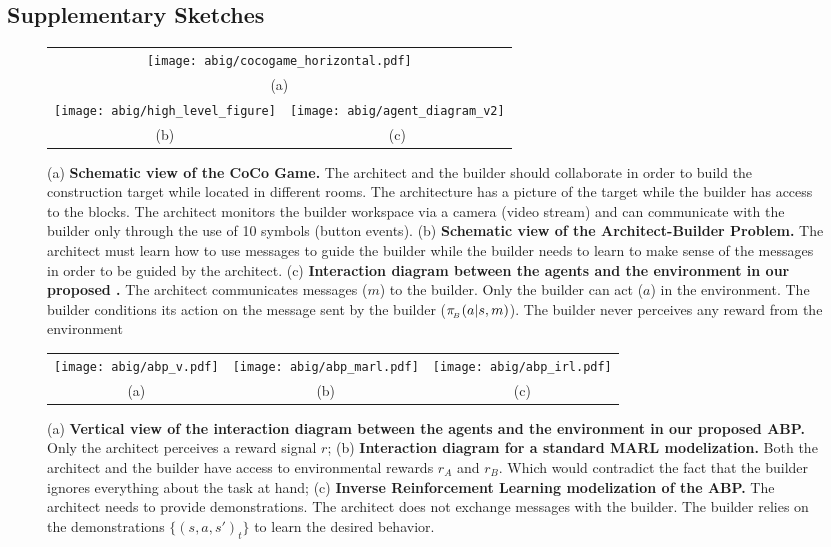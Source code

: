 \subsection{Supplementary Sketches}
\label{ap:sec_sketch}
\begin{figure}[h!]
    \centering
    \begin{tabular}{cc}
    \multicolumn{2}{c}{\texttt{[image: abig/cocogame\_horizontal.pdf]}}\\
    \multicolumn{2}{c}{\small (a)}\\
 \texttt{[image: abig/high\_level\_figure]}    &  \texttt{[image: abig/agent\_diagram\_v2]} \\
    \small (b) & \small(c)
    \end{tabular}
    \caption{\small (a) \textbf{Schematic view of the CoCo Game.} The architect and the builder should collaborate in order to build the construction target while located in different rooms. The architecture has a picture of the target while the builder has access to the blocks. The architect monitors the builder workspace via a camera (video stream) and can communicate with the builder only through the use of 10 symbols (button events). (b) \textbf{Schematic view of the Architect-Builder Problem. } The architect must learn how to use messages to guide the builder while the builder needs to learn to make sense of the messages in order to be guided by the architect. (c) \textbf{Interaction diagram between the agents and the environment in our proposed \abp.} The architect communicates messages ($m$) to the builder.  Only the builder can act ($a$) in the environment. The builder conditions its action on the message sent by the builder ($\pi_{\!_B}(a|s,m)$). The builder never perceives any reward from the environment}
    \label{fig:sup_diagram}
\end{figure}

\begin{figure}[h!]
    \centering
    \begin{tabular}{cccc}
    \texttt{[image: abig/abp\_v.pdf]} & \texttt{[image: abig/abp\_marl.pdf]} &  \multicolumn{2}{c}{\texttt{[image: abig/abp\_irl.pdf]}}\\
    \small (a) & \small(b) & \multicolumn{2}{c}{\small(c)}
    \end{tabular}
    \caption{\small (a) \textbf{Vertical view of the interaction diagram between the agents and the environment in our proposed ABP. } Only the architect perceives a reward signal $r$; (b) \textbf{Interaction diagram for a standard MARL modelization. } Both the architect and the builder have access to environmental rewards $r_A$ and $r_B$. Which would contradict the fact that the builder ignores everything about the task at hand; (c) \textbf{Inverse Reinforcement Learning modelization of the ABP. } The architect needs to provide demonstrations. The architect does not exchange messages with the builder. The builder relies on the demonstrations $\{(s,a,s')_t\}$ to learn the desired behavior.}
    \label{fig:sup_mdp_diag}
\end{figure}

